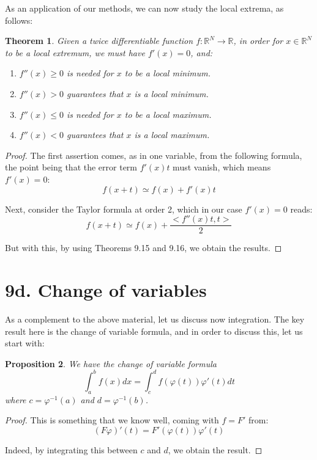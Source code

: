 \documentclass[12pt]{amsbook}
\newtheorem{theorem}{Theorem}[chapter]
\newtheorem{proposition}[theorem]{Proposition}
\begin{document}
As an application of our methods, we can now study the local extrema, as follows:

\begin{theorem}
Given a twice differentiable function $f:\mathbb R^N\to\mathbb R$, in order for $x\in\mathbb R^N$ to be a local extremum, we must have $f'(x)=0$, and:
\begin{enumerate}
\item $f''(x)\geq0$ is needed for $x$ to be a local minimum.

\item $f''(x)>0$ guarantees that $x$ is a local minimum.

\item $f''(x)\leq0$ is needed for $x$ to be a local maximum.

\item $f''(x)<0$ guarantees that $x$ is a local maximum.
\end{enumerate}
\end{theorem}

\begin{proof}
The first assertion comes, as in one variable, from the following formula, the point being that the error term $f'(x)t$ must vanish, which means $f'(x)=0$:
$$f(x+t)\simeq f(x)+f'(x)t$$

Next, consider the Taylor formula at order 2, which in our case $f'(x)=0$ reads:
$$f(x+t)\simeq f(x)+\frac{<f''(x)t,t>}{2}$$

But with this, by using Theorems 9.15 and 9.16, we obtain the results.
\end{proof}

\section*{9d. Change of variables}

As a complement to the above material, let us discuss now integration. The key result here is the change of variable formula, and in order to discuss this, let us start with:

\begin{proposition}
We have the change of variable formula
$$\int_a^bf(x)dx=\int_c^df(\varphi(t))\varphi'(t)dt$$
where $c=\varphi^{-1}(a)$ and $d=\varphi^{-1}(b)$.
\end{proposition}

\begin{proof}
This is something that we know well, coming with $f=F'$ from:
$$(F\varphi)'(t)=F'(\varphi(t))\varphi'(t)$$

Indeed, by integrating this between $c$ and $d$, we obtain the result.
\end{proof}
\end{document}
